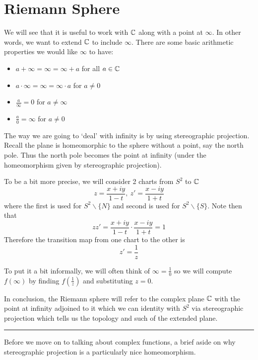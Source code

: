 \section{Riemann Sphere}
We will see that it is useful to work with $\mathbb{C}$ along with a point at $\infty$. In other words, we want to extend $\mathbb{C}$ to include $\infty$. There are some basic arithmetic properties we would like $\infty$ to have:
\begin{itemize}[topsep=0pt, itemsep=0pt]
    \item $a + \infty = \infty = \infty + a$ for all $a \in \mathbb{C}$
    \item $a \cdot \infty = \infty = \infty \cdot a$ for $a \neq 0$
    \item $\frac{a}{\infty} = 0$ for $a \neq \infty$
    \item $\frac{a}{0} = \infty$ for $a \neq 0$
\end{itemize}

The way we are going to `deal' with infinity is by using stereographic projection. Recall the plane is homeomorphic to the sphere without a point, say the north pole. Thus the north pole becomes the point at infinity (under the homeomorphism given by stereographic projection). 

To be a bit more precise, we will consider 2 charts from $S^2$ to $\mathbb{C}$
$$ z = \frac{x + iy}{1 - t}, \ z' = \frac{x - iy}{1 + t} $$
where the first is used for $S^2 \backslash \{N\}$ and second is used for $S^2 \backslash \{S\}$. Note then that 
$$ zz' = \frac{x + iy}{1 - t} \cdot \frac{x - iy}{1 + t} = 1 $$
Therefore the transition map from one chart to the other is 
$$ z' = \frac{1}{z} $$

To put it a bit informally, we will often think of $\infty = \frac{1}{0}$ so we will compute $f(\infty)$ by finding $f\left(\frac{1}{z}\right)$ and substituting $z = 0$. 

In conclusion, the Riemann sphere will refer to the complex plane $\mathbb{C}$ with the point at infinity adjoined to it which we can identity with $S^2$ via stereographic projection which tells us the topology and such of the extended plane.

\begin{center}
    \rule{1in}{0.5pt}
\end{center}

Before we move on to talking about complex functions, a brief aside on why stereographic projection is a particularly nice homeomorphism. 

